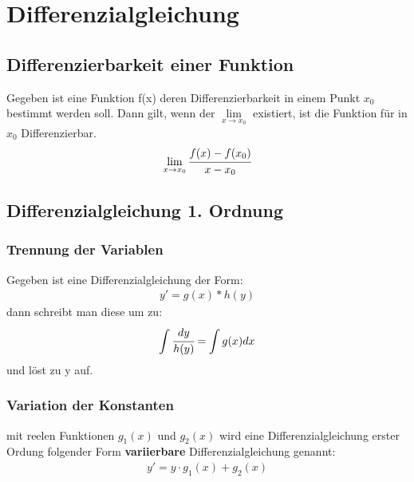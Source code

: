 \documentclass[german]{latex4ei/latex4ei_sheet}
\begin{document}
\section{Differenzialgleichung}
\begin{sectionbox}

\subsection{Differenzierbarkeit einer Funktion}
Gegeben ist eine Funktion f(x) deren Differenzierbarkeit in einem Punkt $x_0 $ 
bestimmt werden soll. Dann gilt, wenn der $\lim\limits_{x \rightarrow x_0} $
existiert, ist die Funktion für in $x_0 $ Differenzierbar.
\begin{align*}
    \lim\limits_{x \rightarrow x_0}{ \cfrac{f(x)-f(x_0)}{x-x_0}}
\end{align*}

\subsection{Differenzialgleichung 1. Ordnung}

\subsubsection{Trennung der Variablen}\label{trennung-variablen}
Gegeben ist eine Differenzialgleichung der Form:
\begin{align*}
    y' = g(x) * h(y)
\end{align*}
dann schreibt man diese um zu:
\begin{align*}
    \int \cfrac{dy}{h(y)} = \int g(x) dx
\end{align*}
und löst zu y auf.


\subsubsection{Variation der Konstanten}
mit reelen Funktionen $g_1(x)$ und $g_2(x)$ wird eine Differenzialgleichung erster Ordung folgender Form \textbf{variierbare} Differenzialgleichung genannt:
\begin{align}\label{variation-gleichung}
    y'=y \cdot g_1(x) + g_2(x)
\end{align}

\end{sectionbox}
\end{document}
